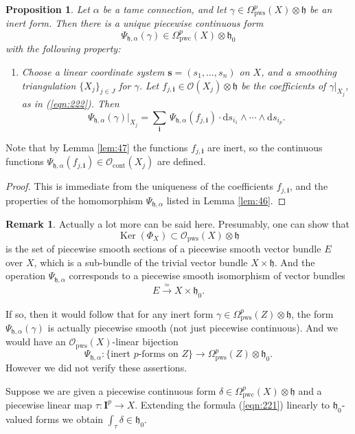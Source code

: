 \documentclass[10pt, a4paper]{amsart}
\newtheorem{prop}[equation]{Proposition}
\theoremstyle{definition}
\newtheorem{rem}[equation]{Remark}
\numberwithin{equation}{section}
\newcommand{\iso}{\xrightarrow{\simeq}}
\newcommand{\opn}{\operatorname}
\newcommand{\mfrak}[1]{\mathfrak{#1}}
\newcommand{\mcal}[1]{\mathcal{#1}}
\newcommand{\mbf}[1]{\mathbf{#1}}
\newcommand{\mrm}[1]{\mathrm{#1}}
\newcommand{\tup}[1]{\textup{#1}}
\newcommand{\bsym}[1]{\boldsymbol{#1}}
\newcommand{\h}{\mfrak{h}}
\renewcommand{\d}{\mrm{d}}
\begin{document}
\begin{prop} \label{prop:18}
Let $\alpha$ be a tame connection, and let
$\gamma \in \Omega^p_{\mrm{pws}}(X) \otimes \h$ be an inert form.
Then there is a unique piecewise continuous form
\[ \Psi_{\h, \alpha}(\gamma) \in \Omega^p_{\mrm{pwc}}(X) \otimes \h_0 \]
with the following property:
\begin{enumerate}
\item[($*$)] Choose a linear coordinate system 
$\bsym{s} = (s_1, \ldots, s_n)$ on $X$, and a smoothing
triangulation $\{ X_j \}_{j \in J}$ for $\gamma$. 
Let $f_{j, \bsym{i}} \in \mcal{O}(X_j) \otimes \h$
be the coefficients of $\gamma|_{X_j}$, as in \tup{(\ref{eqn:222})}.
Then
\[ \Psi_{\h, \alpha}(\gamma)|_{X_j} = 
\sum_{\bsym{i}} \, \Psi_{\h, \alpha}(f_{j, \bsym{i}}) \cdot 
\d s_{i_1} \wedge \cdots \wedge \d s_{i_p} . \]
\end{enumerate}
\end{prop}

Note that by Lemma \ref{lem:47} the functions $f_{j, \bsym{i}}$ are inert, 
so the continuous functions
$\Psi_{\h, \alpha}(f_{j, \bsym{i}}) \in \mcal{O}_{\mrm{cont}}(X_j)$ are defined.

\begin{proof}
This is immediate from the uniqueness of the coefficients
$f_{j, \bsym{i}}$, and the properties of the homomorphism
$\Psi_{\h, \alpha}$ listed in Lemma \ref{lem:46}.
\end{proof}

\begin{rem}
Actually a lot more can be said here. Presumably, one can show that 
\[ \opn{Ker}(\Phi_X) \subset \mcal{O}_{\mrm{pws}}(X) \otimes \h  \]
is the set of piecewise smooth sections of a piecewise smooth
vector bundle $E$ over $X$, which is a sub-bundle of the
trivial vector bundle $X \times \h$. 
And the operation $\Psi_{\h, \alpha}$ corresponds to a piecewise smooth
isomorphism of vector bundles
\[ E \iso  X \times \h_0 . \]

If so, then it would follow that for any inert form 
$\gamma \in \Omega^p_{\mrm{pws}}(Z) \otimes \h$, the form 
$\Psi_{\h, \alpha}(\gamma)$ is actually piecewise smooth (not just piecewise
continuous). And we would have an $\mcal{O}_{\mrm{pws}}(X)$-linear bijection
\[ \Psi_{\h, \alpha} : \{ \text{inert $p$-forms on } Z \} 
\to \Omega^p_{\mrm{pws}}(Z) \otimes \h_0 . \]
However we did not verify these assertions.
\end{rem}

Suppose we are given a piecewise continuous form
$\delta \in \Omega^p_{\mrm{pwc}}(X) \otimes \h$
and a piecewise linear map $\tau : \mbf{I}^p \to X$.
Extending the formula (\ref{eqn:221}) linearly to $\h_0$-valued forms we obtain
$\int_{\tau} \delta \in \h_0$.
\end{document}
